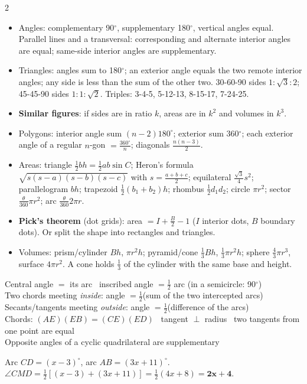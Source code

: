 \documentclass[10pt]{article}
\makeatletter
\newcommand{\sub}[1]{\par\vspace{2.5pt}{\sffamily\bfseries\color{dblue}#1}\par\nobreak\vspace{0.5pt}\@afterheading}
\newcommand{\term}[1]{\textbf{\color{dnavy}#1}}
\newcounter{fig}
\makeatother
\begin{document}
\begin{multicols}{2}
\sub{G. Geometry}
\begin{itemize}
\item Angles: complementary 90$^\circ$, supplementary 180$^\circ$, vertical angles equal. Parallel lines and a transversal: corresponding and alternate interior angles are equal; same-side interior angles are supplementary.
\item Triangles: angles sum to 180$^\circ$; an exterior angle equals the two remote interior angles; any side is less than the sum of the other two. 30-60-90 sides $1:\sqrt3:2$; 45-45-90 sides $1:1:\sqrt2$. Triples: 3-4-5, 5-12-13, 8-15-17, 7-24-25.
\item \term{Similar figures}: if sides are in ratio $k$, areas are in $k^2$ and volumes in $k^3$.
\item Polygons: interior angle sum $(n-2)180^\circ$; exterior sum 360$^\circ$; each exterior angle of a regular $n$-gon $=\frac{360^\circ}n$; diagonals $\frac{n(n-3)}2$.
\item Areas: triangle $\frac12bh=\frac12ab\sin C$; Heron's formula $\sqrt{s(s-a)(s-b)(s-c)}$ with $s=\frac{a+b+c}2$; equilateral $\frac{\sqrt3}4s^2$; parallelogram $bh$; trapezoid $\frac12(b_1+b_2)h$; rhombus $\frac12d_1d_2$; circle $\pi r^2$; sector $\frac\theta{360}\pi r^2$; arc $\frac\theta{360}2\pi r$.
\item \term{Pick's theorem} (dot grids): area $=I+\frac B2-1$ ($I$ interior dots, $B$ boundary dots). Or split the shape into rectangles and triangles.
\item Volumes: prism/cylinder $Bh$, $\pi r^2h$; pyramid/cone $\frac13Bh$, $\frac13\pi r^2h$; sphere $\frac43\pi r^3$, surface $4\pi r^2$. A cone holds $\frac13$ of the cylinder with the same base and height.
\end{itemize}
\begin{formbox}
Central angle $=$ its arc \textbullet\ inscribed angle $=\frac12$ arc (in a semicircle: 90$^\circ$)\\
Two chords meeting \emph{inside}: angle $=\frac12$(sum of the two intercepted arcs)\\
Secants/tangents meeting \emph{outside}: angle $=\frac12$(difference of the arcs)\\
Chords: $(AE)(EB)=(CE)(ED)$ \textbullet\ tangent $\perp$ radius \textbullet\ two tangents from one point are equal\\
Opposite angles of a cyclic quadrilateral are supplementary
\end{formbox}
\begin{dost}
Arc $CD=(x-3)^\circ$, arc $AB=(3x+11)^\circ$. $\angle CMD=\frac12[(x-3)+(3x+11)]=\frac12(4x+8)=\mathbf{2x+4}$.
\end{dost}


\end{multicols}
\end{document}
